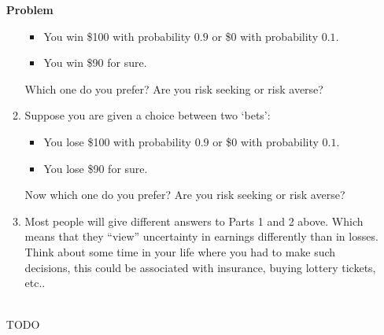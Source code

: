 \documentclass[12pt]{article}
\newenvironment{Ex}{\textbf{Problem}\vspace{.75em}\\}{}
\begin{document}
\begin{enumerate}
\begin{Ex}
\begin{enumerate}
        \begin{itemize}
        \item You win \$100 with probability $0.9$ or \$0 with
          probability $0.1$.
        \item You win \$90 for sure.
        \end{itemize}
        Which one do you prefer? Are you risk
        seeking or risk averse?
      \item Suppose you are given a choice
        between two `bets':
        \begin{itemize}
        \item You lose \$100 with probability $0.9$ or \$0 with
          probability $0.1$.
        \item You lose \$90 for sure.
        \end{itemize}
        Now which one do you prefer? Are you risk seeking or risk averse?
      \item Most people will give different answers to Parts 1 and 2
        above. Which means that they ``view'' uncertainty in earnings
        differently than in losses. Think about some time in your life
        where you had to make such decisions, this could be associated
        with insurance, buying lottery tickets, etc..
      \end{enumerate}
      \begin{solution} \hfill \\
        {\huge TODO}
      \end{solution}
    \end{Ex}
  \end{enumerate}
\end{document}
